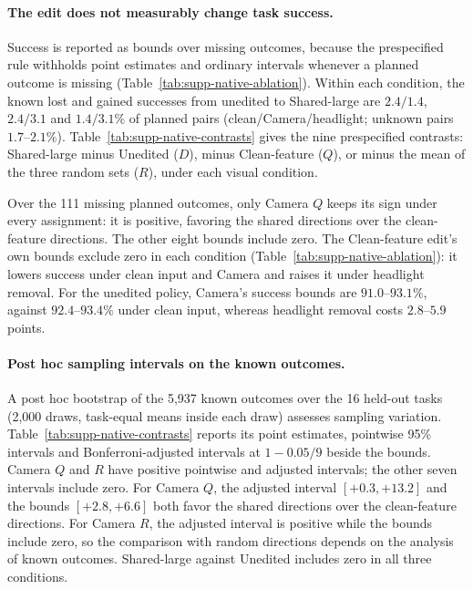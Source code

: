 \paragraph{The edit does not measurably change task success.}
Success is reported as bounds over missing outcomes, because the prespecified rule withholds point estimates and ordinary intervals whenever a planned outcome is missing (Table~\ref{tab:supp-native-ablation}). Within each condition, the known lost and gained successes from unedited to Shared-large are $2.4/1.4$, $2.4/3.1$ and $1.4/3.1\%$ of planned pairs (clean/Camera/headlight; unknown pairs $1.7$--$2.1\%$). Table~\ref{tab:supp-native-contrasts} gives the nine prespecified contrasts: Shared-large minus Unedited ($D$), minus Clean-feature ($Q$), or minus the mean of the three random sets ($R$), under each visual condition.



Over the 111 missing planned outcomes, only Camera $Q$ keeps its sign under every assignment: it is positive, favoring the shared directions over the clean-feature directions. The other eight bounds include zero. The Clean-feature edit's own bounds exclude zero in each condition (Table~\ref{tab:supp-native-ablation}): it lowers success under clean input and Camera and raises it under headlight removal. For the unedited policy, Camera's success bounds are $91.0$--$93.1\%$, against $92.4$--$93.4\%$ under clean input, whereas headlight removal costs $2.8$--$5.9$ points. 

\paragraph{Post hoc sampling intervals on the known outcomes.}
A post hoc bootstrap of the 5,937 known outcomes over the 16 held-out tasks (2,000 draws, task-equal means inside each draw) assesses sampling variation. Table~\ref{tab:supp-native-contrasts} reports its point estimates, pointwise 95\% intervals and Bonferroni-adjusted intervals at $1-0.05/9$ beside the bounds. Camera $Q$ and $R$ have positive pointwise and adjusted intervals; the other seven intervals include zero. For Camera $Q$, the adjusted interval $[+0.3,+13.2]$ and the bounds $[+2.8,+6.6]$ both favor the shared directions over the clean-feature directions. For Camera $R$, the adjusted interval is positive while the bounds include zero, so the comparison with random directions depends on the analysis of known outcomes. Shared-large against Unedited includes zero in all three conditions.

